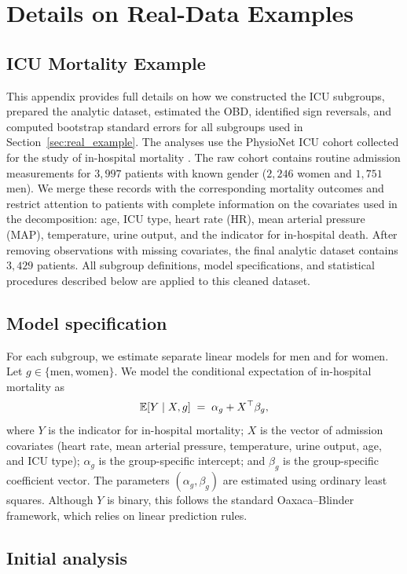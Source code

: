 \section{Details on Real-Data Examples}
\subsection{ICU Mortality Example}
\label{appendix:icu_details}

This appendix provides full details on how we constructed the ICU subgroups, prepared the analytic dataset, estimated the OBD, identified sign reversals, and computed bootstrap standard errors for all subgroups used in Section~\ref{sec:real_example}. The analyses use the PhysioNet ICU cohort collected for the study of in-hospital mortality \citep{goldberger2000physiobank}. The raw cohort contains routine admission measurements for $3,997$ patients with known gender ($2,246$ women and $1,751$ men). We merge these records with the corresponding mortality outcomes and restrict attention to patients with complete information on the covariates used in the decomposition: age, ICU type, heart rate (HR), mean arterial pressure (MAP), temperature, urine output, and the indicator for in-hospital death. After removing observations with missing covariates, the final analytic dataset contains $3,429$ patients. All subgroup definitions, model specifications, and statistical procedures described below are applied to this cleaned dataset.

\subsection*{Model specification}

For each subgroup, we estimate separate linear models for men and for women.  
Let $g \in \{\text{men}, \text{women}\}$.  
We model the conditional expectation of in-hospital mortality as
\[
    \mathbb{E}[Y \mid X, g] \;=\; \alpha_{g} + X^{\top}\beta_{g},
\]
where $Y$ is the indicator for in-hospital mortality;  
$X$ is the vector of admission covariates (heart rate, mean arterial pressure, temperature, urine output, age, and ICU type);  
$\alpha_{g}$ is the group-specific intercept;  
and $\beta_{g}$ is the group-specific coefficient vector.  
The parameters $(\alpha_g,\beta_g)$ are estimated using ordinary least squares.  
Although $Y$ is binary, this follows the standard Oaxaca--Blinder framework, which relies on linear prediction rules.

\subsection*{Initial analysis}

